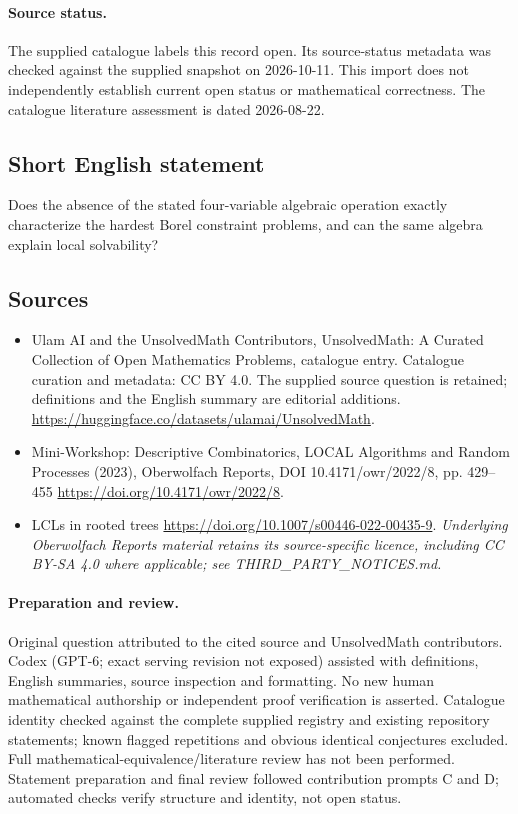 \documentclass[11pt]{article}
\begin{document}
\paragraph{Source status.}
The supplied catalogue labels this record open. Its source-status metadata was checked against the supplied snapshot on 2026-10-11. This import does not independently establish current open status or mathematical correctness. The catalogue literature assessment is dated 2026-08-22.
\subsection{Short English statement}
Does the absence of the stated four-variable algebraic operation exactly characterize the hardest Borel constraint problems, and can the same algebra explain local solvability?
\subsection{Sources}
\begin{itemize}
\item[\hypertarget{source:statement:1}{S1}] Ulam AI and the UnsolvedMath Contributors, UnsolvedMath: A Curated Collection of Open Mathematics Problems, catalogue entry. Catalogue curation and metadata: CC BY 4.0. The supplied source question is retained; definitions and the English summary are editorial additions.
\url{https://huggingface.co/datasets/ulamai/UnsolvedMath}.
\item[\hypertarget{source:statement:2}{S2}] Mini-Workshop: Descriptive Combinatorics, LOCAL Algorithms and Random Processes (2023), Oberwolfach Reports, DOI 10.4171/owr/2022/8, pp. 429--455
\url{https://doi.org/10.4171/owr/2022/8}.
\item[\hypertarget{source:statement:3}{S3}] LCLs in rooted trees
\url{https://doi.org/10.1007/s00446-022-00435-9}.
\textit{Underlying Oberwolfach Reports material retains its source-specific licence, including CC BY-SA 4.0 where applicable; see THIRD\_PARTY\_NOTICES.md.}
\end{itemize}
\paragraph{Preparation and review.}
Original question attributed to the cited source and UnsolvedMath contributors. Codex (GPT-6; exact serving revision not exposed) assisted with definitions, English summaries, source inspection and formatting. No new human mathematical authorship or independent proof verification is asserted. Catalogue identity checked against the complete supplied registry and existing repository statements; known flagged repetitions and obvious identical conjectures excluded. Full mathematical-equivalence/literature review has not been performed. Statement preparation and final review followed contribution prompts C and D; automated checks verify structure and identity, not open status.
\label{end:statement}
\end{document}
